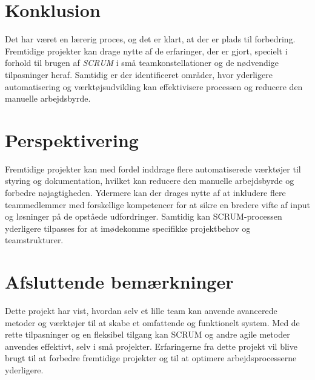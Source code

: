 \section{Konklusion}
\label{sec:conclusion_conclusion}
Det har været en lærerig proces, og det er klart, at der er plads til forbedring. Fremtidige projekter kan drage nytte af de erfaringer, der er gjort, specielt i forhold til brugen af \emph{SCRUM} i små teamkonstellationer og de nødvendige tilpasninger heraf. 
Samtidig er der identificeret områder, hvor yderligere automatisering og værktøjsudvikling kan effektivisere processen og reducere den manuelle arbejdsbyrde.

\section{Perspektivering}
\label{sec:conclusion_perspective}
Fremtidige projekter kan med fordel inddrage flere automatiserede værktøjer til styring og dokumentation, hvilket kan reducere den manuelle arbejdsbyrde og forbedre nøjagtigheden. 
Ydermere kan der drages nytte af at inkludere flere teammedlemmer med forskellige kompetencer for at sikre en bredere vifte af input og løsninger på de opståede udfordringer. 
Samtidig kan SCRUM-processen yderligere tilpasses for at imødekomme specifikke projektbehov og teamstrukturer.

\section{Afsluttende bemærkninger}
\label{sec:conclusion_remarks}
Dette projekt har vist, hvordan selv et lille team kan anvende avancerede metoder og værktøjer til at skabe et omfattende og funktionelt system. 
Med de rette tilpasninger og en fleksibel tilgang kan SCRUM og andre agile metoder anvendes effektivt, selv i små projekter. 
Erfaringerne fra dette projekt vil blive brugt til at forbedre fremtidige projekter og til at optimere arbejdsprocesserne yderligere.
